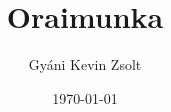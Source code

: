 \documentclass{book}
\begin{document}

\title{Oraimunka}
\author{Gyáni Kevin Zsolt}
\date{\today}
\maketitle
\blindtext
\blindtext
\end{document}
